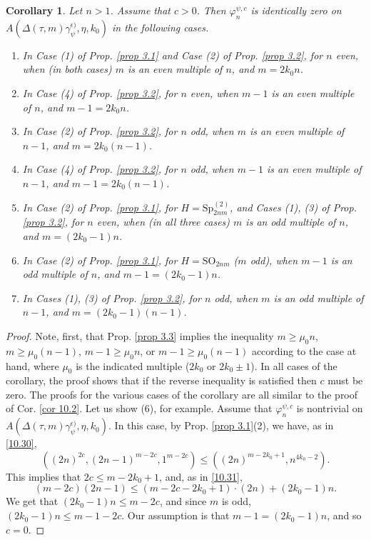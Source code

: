 \documentclass[12pts]{amsart}
\newcommand{\SO}{{\mathrm{SO}}}
\newcommand{\Sp}{{\mathrm{Sp}}}
\newtheorem{cor}[thm]{Corollary}
\begin{document}
\begin{cor}\label{cor 10.3} 
Let $n>1$. Assume that $c>0$. Then $\varphi_n^{\psi,c}$ is identically zero on $A(\Delta(\tau,m)\gamma_\psi^{\epsilon)},\eta,k_0)$ in the following cases.
\begin{enumerate}
\item In Case (1) of Prop. \ref{prop 3.1} and Case (2) of Prop. \ref{prop 3.2}, for $n$ even, when (in both cases) $m$ is an even multiple of $n$, and $m=2k_0n$.\\
\item In Case (4) of Prop. \ref{prop 3.2}, for $n$ even, when $m-1$ is an even multiple of $n$, and   $m-1=2k_0n$.\\
\item In Case (2) of Prop. \ref{prop 3.2}, for $n$ odd, when $m$ is an even multiple of $n-1$, and $m=2k_0(n-1)$.\\
\item In Case (4) of Prop. \ref{prop 3.2}, for $n$ odd, when $m-1$ is an even multiple of $n-1$, and $m-1=2k_0(n-1)$.\\
\item In Case (2) of Prop. \ref{prop 3.1}, for $H=\Sp_{2nm}^{(2)}$, and Cases (1), (3)  of Prop. \ref{prop 3.2}, for $n$ even, when (in all three cases) $m$ is an odd multiple of $n$, and $m=(2k_0-1)n$.\\
\item In Case (2) of Prop. \ref{prop 3.1}, for $H=\SO_{2nm}$ ($m$ odd), when $m-1$ is an odd multiple of $n$, and $m-1=(2k_0-1)n$.\\
\item In Cases (1), (3) of Prop. \ref{prop 3.2}, for $n$ odd, when $m$ is an odd multiple of $n-1$, and $m=(2k_0-1)(n-1)$.
\end{enumerate}
\end{cor}
\begin{proof}
Note, first, that Prop. \ref{prop 3.3} implies the inequality $m\geq \mu_0n$, $m\geq \mu_0(n-1)$, $m-1\geq \mu_0n$, or $m-1\geq \mu_0(n-1)$ according to the case at hand, where $\mu_0$ is the indicated multiple ($2k_0$ or $2k_0\pm 1$). In all cases of the corollary, the proof shows that if the reverse inequality is satisfied then $c$ must be zero. The proofs for the various cases of the corollary are all similar to the proof of Cor. \ref{cor 10.2}. Let us show (6), for example. Assume that $\varphi_n^{\psi,c}$ is nontrivial on $A(\Delta(\tau,m)\gamma_\psi^{\epsilon)},\eta,k_0)$. In this case, by Prop. \ref{prop 3.1}(2), we have, as in \eqref{10.30},
$$
((2n)^{2c},(2n-1)^{m-2c},1^{m-2c})\leq ((2n)^{m-2k_0+1},n^{4k_0-2}).
$$
This implies that $2c\leq m-2k_0+1$, and, as in \eqref{10.31},
$$
(m-2c)(2n-1)\leq (m-2c-2k_0+1)\cdot (2n)+(2k_0-1)n.
$$
We get that $(2k_0-1)n\leq m-2c$, and since $m$ is odd, $(2k_0-1)n\leq m-1-2c$. Our assumption is that $m-1=(2k_0-1)n$, and so $c=0$.

\end{proof}
\end{document}
